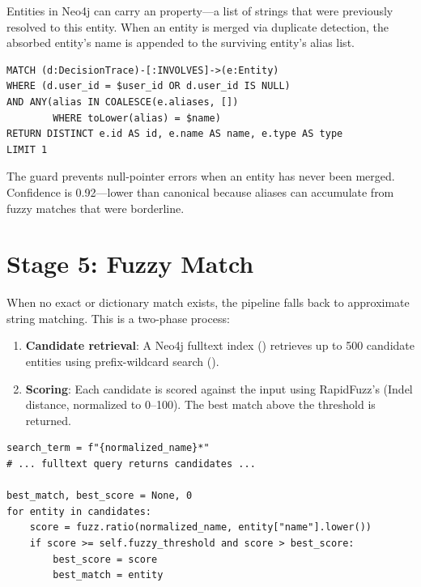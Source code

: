 Entities in Neo4j can carry an  property---a list of strings
that were previously resolved to this entity.  When an entity is merged
via duplicate detection, the absorbed entity's name is appended to the
surviving entity's alias list.

\begin{lstlisting}[style=cypher, caption={Alias search query.}]
MATCH (d:DecisionTrace)-[:INVOLVES]->(e:Entity)
WHERE (d.user_id = $user_id OR d.user_id IS NULL)
AND ANY(alias IN COALESCE(e.aliases, [])
        WHERE toLower(alias) = $name)
RETURN DISTINCT e.id AS id, e.name AS name, e.type AS type
LIMIT 1
\end{lstlisting}

The  guard prevents null-pointer errors when
an entity has never been merged.  Confidence is 0.92---lower than canonical
because aliases can accumulate from fuzzy matches that were borderline.


\section{Stage 5: Fuzzy Match}
\label{sec:er-fuzzy}

When no exact or dictionary match exists, the pipeline falls back to
approximate string matching.  This is a two-phase process:

\begin{enumerate}
    \item \textbf{Candidate retrieval}: A Neo4j fulltext index
          () retrieves up to 500 candidate entities
          using prefix-wildcard search ().
    \item \textbf{Scoring}: Each candidate is scored against the input
          using RapidFuzz's  (Indel distance, normalized
          to 0--100).  The best match above the threshold is returned.
\end{enumerate}

\begin{lstlisting}[style=python, caption={Fuzzy matching with fulltext acceleration.}]
search_term = f"{normalized_name}*"
# ... fulltext query returns candidates ...

best_match, best_score = None, 0
for entity in candidates:
    score = fuzz.ratio(normalized_name, entity["name"].lower())
    if score >= self.fuzzy_threshold and score > best_score:
        best_score = score
        best_match = entity
\end{lstlisting}

